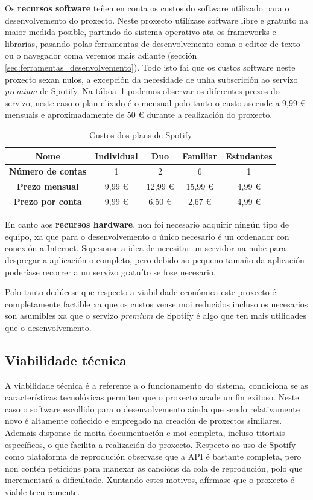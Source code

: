 Os \textbf{recursos software} teñen en conta os custos do software utilizado para o desenvolvemento do proxecto. Neste proxecto utilízase software libre e gratuíto na maior medida posible, partindo do sistema operativo ata os frameworks e librarías, pasando polas ferramentas de desenvolvemento coma o editor de texto ou o navegador coma veremos mais adiante (sección \ref{sec:ferramentas_desenvolvemento}). Todo isto fai que os custos software neste proxecto sexan nulos, a excepción da necesidade de unha subscrición ao servizo \textit{premium} de Spotify. Na táboa~\ref{tab:spotify_plans} podemos observar os diferentes prezos do servizo, neste caso o plan elixido é o mensual polo tanto o custo ascende a 9,99 € mensuais e aproximadamente de 50 € durante a realización do proxecto.

\begin{table}[ht!]
	\caption{Custos dos plans de Spotify}
	\label{tab:spotify_plans}
	\centering
	\begin{tabular}{|c|c|c|c|c|}
		\hline
		{\textbf{Nome}}             & Individual & Duo    & Familiar & Estudantes \\ \hline
		{\textbf{Número de contas}} & 1          & 2      & 6        & 1          \\ \hline
		{\textbf{Prezo mensual}}    & 9,99 €     & 12,99 €& 15,99 €  & 4,99 €      \\ \hline
		{\textbf{Prezo por conta}}  & 9,99 €     & 6,50 € & 2,67 €   & 4,99 €      \\ \hline
	\end{tabular}
\end{table}

En canto aos \textbf{recursos hardware}, non foi necesario adquirir ningún tipo de equipo, xa que para o desenvolvemento o único necesario é un ordenador con conexión a Internet. Sopesouse a idea de necesitar un servidor na nube para despregar a aplicación o completo, pero debido ao pequeno tamaño da aplicación poderíase recorrer a un servizo gratuíto se fose necesario.

Polo tanto dedúcese que respecto a viabilidade económica este proxecto é completamente factible xa que os custos vense moi reducidos incluso os necesarios son asumibles xa que o servizo \textit{premium} de Spotify é algo que ten mais utilidades que o desenvolvemento.

\subsection{Viabilidade técnica}
A viabilidade técnica é a referente a o funcionamento do sistema, condiciona se as características tecnolóxicas permiten que o proxecto acade un fin exitoso. Neste caso o software escollido para o desenvolvemento aínda que sendo relativamente novo é altamente coñecido e empregado na creación de proxectos similares. Ademais disponse de moita documentación e moi completa, incluso titoriais específicos, o que facilita a realización do proxecto. Respecto ao uso de Spotify como plataforma de reprodución observase que a API é bastante completa, pero non contén peticións para manexar as cancións da cola de reprodución, polo que incrementará a dificultade. Xuntando estes motivos, afírmase que o proxecto é viable tecnicamente.

